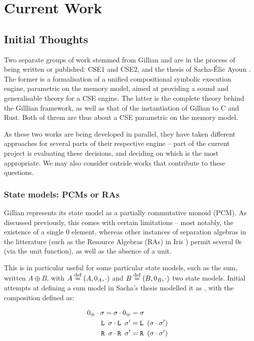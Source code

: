 \chapter{Current Work}

\section{Initial Thoughts}

Two separate groups of work stemmed from Gillian \cite{gillian0, gillian1, gillian2} and are in the process of being written or published: CSE1 \cite{cse1} and CSE2, and the thesis of Sacha-Élie Ayoun \cite{sacha-phd}. The former is a formalisation of a unified compositional symbolic execution engine, parametric on the memory model, aimed at providing a sound and generalisable theory for a CSE engine. The latter is the complete theory behind the Gilllian framework, as well as that of the instantiation of Gillian to C and Rust. Both of threm are thus about a CSE parametric on the memory model.

As these two works are being developed in parallel, they have taken different approaches for several parts of their respective engine -- part of the current project is evaluating these decisions, and deciding on which is the most appropriate. We may also consider outside works that contribute to these questions.

\subsection{State models: PCMs or RAs}
\label{sec:thoughts-state-models}

Gillian represents its state model as a partially commutative monoid (PCM). As discussed previously, this comes with certain limitations -- most notably, the existence of a single $0$ element, whereas other instances of separation algebras in the litterature (such as the Resource Algebras (RAs) in Iris \cite{iris}) permit several $0$s (via the unit function), as well as the absence of a unit.

This is in particular useful for some particular state models, such as the sum, written $A \oplus B$, with $A\stackrel{\textnormal{def}}=(A,0_A,\cdot)$ and $B\stackrel{\textnormal{def}}=(B,0_B,\cdot)$ two state models. Initial attempts at defining a sum model in Sacha's thesis modelled it as , with the composition defined as:

{
\newcommand{\LS}[0]{\code{L }}
\newcommand{\RS}[0]{\code{R }}
\begin{align*}
	0_\oplus \cdot \st = \st \cdot 0_\oplus &= \st \\*
	\LS\st \cdot \LS\st' &= \LS (\st\cdot\st') \\*
	\RS\st \cdot \RS\st' &= \RS (\st\cdot\st')
\end{align*}
}


